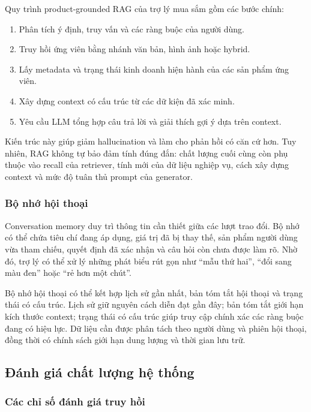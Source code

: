 Quy trình product-grounded RAG của trợ lý mua sắm gồm các bước chính:

\begin{enumerate}
    \item Phân tích ý định, truy vấn và các ràng buộc của người dùng.
    \item Truy hồi ứng viên bằng nhánh văn bản, hình ảnh hoặc hybrid.
    \item Lấy metadata và trạng thái kinh doanh hiện hành của các sản phẩm ứng viên.
    \item Xây dựng context có cấu trúc từ các dữ kiện đã xác minh.
    \item Yêu cầu LLM tổng hợp câu trả lời và giải thích gợi ý dựa trên context.
\end{enumerate}

Kiến trúc này giúp giảm hallucination và làm cho phản hồi có căn cứ hơn. Tuy nhiên, RAG không tự bảo đảm tính đúng đắn: chất lượng cuối cùng còn phụ thuộc vào recall của retriever, tính mới của dữ liệu nghiệp vụ, cách xây dựng context và mức độ tuân thủ prompt của generator.

\subsubsection{Bộ nhớ hội thoại}

Conversation memory duy trì thông tin cần thiết giữa các lượt trao đổi. Bộ nhớ có thể chứa tiêu chí đang áp dụng, giá trị đã bị thay thế, sản phẩm người dùng vừa tham chiếu, quyết định đã xác nhận và câu hỏi còn chưa được làm rõ. Nhờ đó, trợ lý có thể xử lý những phát biểu rút gọn như “mẫu thứ hai”, “đổi sang màu đen” hoặc “rẻ hơn một chút”.

Bộ nhớ hội thoại có thể kết hợp lịch sử gần nhất, bản tóm tắt hội thoại và trạng thái có cấu trúc. Lịch sử giữ nguyên cách diễn đạt gần đây; bản tóm tắt giới hạn kích thước context; trạng thái có cấu trúc giúp truy cập chính xác các ràng buộc đang có hiệu lực. Dữ liệu cần được phân tách theo người dùng và phiên hội thoại, đồng thời có chính sách giới hạn dung lượng và thời gian lưu trữ.

\subsection{Đánh giá chất lượng hệ thống}

\subsubsection{Các chỉ số đánh giá truy hồi}

